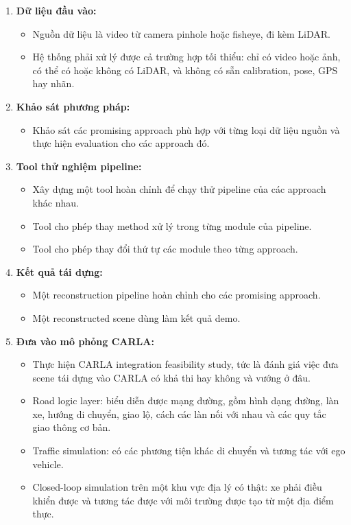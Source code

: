 \begin{enumerate}
  \item \textbf{Dữ liệu đầu vào:}
  \begin{itemize}
    \item Nguồn dữ liệu là video từ camera pinhole hoặc fisheye, đi kèm LiDAR.
    \item Hệ thống phải xử lý được cả trường hợp tối thiểu: chỉ có video hoặc ảnh, có thể có hoặc không có LiDAR, và không có sẵn calibration, pose, GPS hay nhãn.
  \end{itemize}
  \item \textbf{Khảo sát phương pháp:}
  \begin{itemize}
    \item Khảo sát các promising approach phù hợp với từng loại dữ liệu nguồn và thực hiện evaluation cho các approach đó.
  \end{itemize}
  \item \textbf{Tool thử nghiệm pipeline:}
  \begin{itemize}
    \item Xây dựng một tool hoàn chỉnh để chạy thử pipeline của các approach khác nhau.
    \item Tool cho phép thay method xử lý trong từng module của pipeline.
    \item Tool cho phép thay đổi thứ tự các module theo từng approach.
  \end{itemize}
  \item \textbf{Kết quả tái dựng:}
  \begin{itemize}
    \item Một reconstruction pipeline hoàn chỉnh cho các promising approach.
    \item Một reconstructed scene dùng làm kết quả demo.
  \end{itemize}
  \item \textbf{Đưa vào mô phỏng CARLA:}
  \begin{itemize}
    \item Thực hiện CARLA integration feasibility study, tức là đánh giá việc đưa scene tái dựng vào CARLA có khả thi hay không và vướng ở đâu.
    \item Road logic layer: biểu diễn được mạng đường, gồm hình dạng đường, làn xe, hướng di chuyển, giao lộ, cách các làn nối với nhau và các quy tắc giao thông cơ bản.
    \item Traffic simulation: có các phương tiện khác di chuyển và tương tác với ego vehicle.
    \item Closed-loop simulation trên một khu vực địa lý có thật: xe phải điều khiển được và tương tác được với môi trường được tạo từ một địa điểm thực.

\end{itemize}
\end{enumerate}
